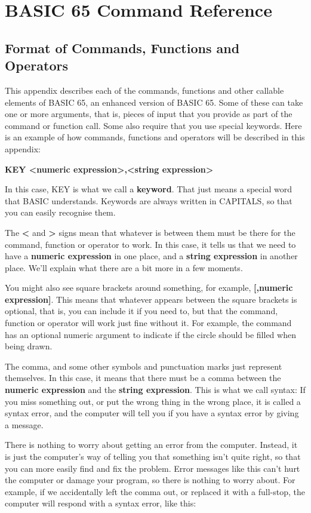 \chapter{BASIC 65 Command Reference}

\section{Format of Commands, Functions and Operators}

This appendix describes each of the commands, functions and other
callable elements of BASIC 65, an enhanced version of BASIC 65.
Some of these can take one or more arguments, that is, pieces of input
that you provide as part of the command or function call.
Some also require that you use special keywords.
Here is an example of how commands, functions and operators will be
described in this appendix:

{\bf KEY <numeric expression>,<string expression> }

In this case, KEY is what we call a \textbf{keyword}. That just means
a special word that BASIC understands.
Keywords are always written in CAPITALS, so that you can easily
recognise them.

The {\bf <} and {\bf >} signs mean that whatever is between them must
be there for the command, function or operator to work.
In this case, it tells us that we need to have a
{\bf numeric expression} in one place, and a {\bf string expression}
in another place.
We'll explain what there are a bit more in a few moments.

You might also see square brackets around something, for example,
{\bf [,numeric expression]}.
This means that whatever appears between the square brackets is
optional, that is, you can include it if you need to, but
that the command, function or operator will work just fine without it.
For example, the  command has
an optional numeric argument to indicate if the circle should be filled
when being drawn.

The comma, and some other symbols and punctuation marks just represent themselves.
In this case, it means that there must be a comma between the
{\bf numeric expression} and the {\bf string expression}.
This is what we call syntax: If you miss something out, or put the
wrong thing in the wrong place, it is called a
syntax error, and the computer will tell you if you have a syntax error
by giving a  message.

There is nothing to worry about getting an error from the computer.
Instead, it is just the computer's way of telling you that something
isn't quite right, so that you can more easily
find and fix the problem.
Error messages like this can't hurt the computer or damage your program,
so there is nothing to worry about.
For example, if we accidentally left the comma out, or replaced it with
a full-stop, the computer will respond with
a syntax error, like this:

